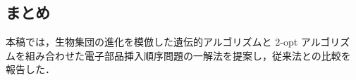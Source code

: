 \documentclass[a4j]{jarticle}
\begin{document}
\begin{Abstract}
 \section{まとめ}
 本稿では，生物集団の進化を模倣した遺伝的アルゴリズムと 2-opt アルゴリズ
 ムを組み合わせた電子部品挿入順序問題の一解法を提案し，従来法との比較を
 報告した．
 

\end{Abstract}
\end{document}
